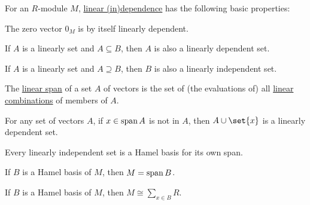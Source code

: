 \begin{proposition}\label{thm:def:semimodule_basis/independent/properties}
  For an \( R \)-module \( M \), \hyperref[def:semimodule_basis/independent]{linear (in)dependence} has the following basic properties:
  \begin{thmenum}
     The zero vector \( 0_M \) is by itself linearly dependent.

     If \( A \) is a linearly  set and \( A \subseteq B \), then \( A \) is also a linearly dependent set.

     If \( A \) is a linearly  set and \( A \supseteq B \), then \( B \) is also a linearly independent set.

     The \hyperref[def:semimodule/submodel]{linear span} of a set \( A \) of vectors is the set of (the evaluations of) all \hyperref[def:linear_combination]{linear combinations} of members of \( A \).

     For any set of vectors \( A \), if \( x \in \operatorname{span} A \) is not in \( A \), then \( A \cup \set{ x } \) is a linearly dependent set.

     Every linearly independent set is a Hamel basis for its own span.

     If \( B \) is a Hamel basis of \( M \), then \( M = \operatorname{span}{ B } \).

     If \( B \) is a Hamel basis of \( M \), then \( M \cong \sum_{x \in B} R \).
  \end{thmenum}
\end{proposition}
